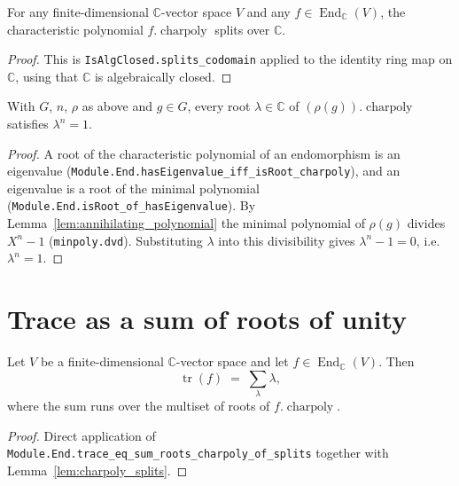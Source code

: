 \begin{lemma}
    \label{lem:charpoly_splits}
    \leanok
    For any finite-dimensional $\mathbb{C}$-vector space $V$ and any
    $f \in \operatorname{End}_{\mathbb{C}}(V)$, the characteristic polynomial
    $f.\operatorname{charpoly}$ splits over $\mathbb{C}$.
\end{lemma}
\begin{proof}
    This is \texttt{IsAlgClosed.splits\_codomain} applied to the identity ring
    map on $\mathbb{C}$, using that $\mathbb{C}$ is algebraically closed.
\end{proof}

\begin{lemma}
    \label{lem:charpoly_roots_roots_of_unity}
    \leanok
    With $G$, $n$, $\rho$ as above and $g \in G$, every root
    $\lambda \in \mathbb{C}$ of $(\rho(g)).\operatorname{charpoly}$ satisfies
    $\lambda^n = 1$.
\end{lemma}
\begin{proof}
    A root of the characteristic polynomial of an endomorphism is an
    eigenvalue (\texttt{Module.End.hasEigenvalue\_iff\_isRoot\_charpoly}), and
    an eigenvalue is a root of the minimal polynomial
    (\texttt{Module.End.isRoot\_of\_hasEigenvalue}). By
    Lemma~\ref{lem:annihilating_polynomial} the minimal polynomial of $\rho(g)$
    divides $X^n - 1$ (\texttt{minpoly.dvd}). Substituting $\lambda$ into this
    divisibility gives $\lambda^n - 1 = 0$, i.e.\ $\lambda^n = 1$.
\end{proof}

\section{Trace as a sum of roots of unity}

\begin{lemma}
    \label{lem:trace_eq_sum_charpoly_roots}
    \leanok
    Let $V$ be a finite-dimensional $\mathbb{C}$-vector space and let
    $f \in \operatorname{End}_{\mathbb{C}}(V)$. Then
    \[ \operatorname{tr}(f) \;=\; \sum_{\lambda} \lambda, \]
    where the sum runs over the multiset of roots of $f.\operatorname{charpoly}$.
\end{lemma}
\begin{proof}
    Direct application of
    \texttt{Module.End.trace\_eq\_sum\_roots\_charpoly\_of\_splits} together with
    Lemma~\ref{lem:charpoly_splits}.
\end{proof}

